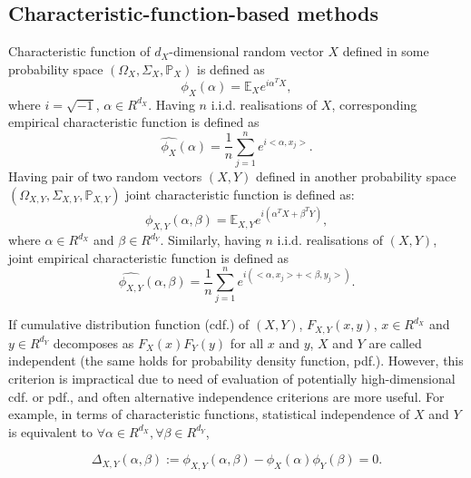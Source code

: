 \documentclass{article}
\begin{document}
\subsection{Characteristic-function-based methods}
\label{section:previous_work_cf}
Characteristic function of $d_{X}$-dimensional random vector $X$ defined in some probability space $(\Omega_{X}, \Sigma_{X}, \mathbb{P}_{X})$ is defined as 
\begin{equation}
    \label{eq:characteristic_function}
    \phi_{X}(\alpha) = \mathbb{E}_{X} e^{i\alpha^{T}X}, 
\end{equation}
where $i=\sqrt{-1}$, $\alpha \in R^{d_{X}}$. Having $n$ i.i.d. realisations of $X$, corresponding empirical characteristic function is defined as
\begin{equation}
    \label{eq:ecf}
  \widehat{\phi_{X}}(\alpha) = \frac{1}{n} \sum_{j=1}^{n} e^{i <\alpha, x_{j}>}.
\end{equation}
Having pair of two random vectors $(X,Y)$ defined in another probability space $(\Omega_{X,Y}, \Sigma_{X,Y}, \mathbb{P}_{X,Y})$  joint characteristic function is defined as:
\begin{equation}
    \label{eq:joint_characteristic_function}
    \phi_{X,Y}(\alpha,\beta) = \mathbb{E}_{X,Y} e^{i(\alpha^{T}X + \beta^{T}Y)},
\end{equation}
where $\alpha \in R^{d_{X}}$ and $\beta \in R^{d_{Y}}$. Similarly, having 
$n$ i.i.d. realisations of $(X,Y)$, joint empirical characteristic function is defined as
\begin{equation}
    \label{eq:joint_ecf}
\widehat{\phi_{X,Y}}(\alpha,\beta) = \frac{1}{n} \sum_{j=1}^{n} e^{i(<\alpha, x_{j}> + <\beta, y_{j}>) }.
\end{equation}

If cumulative distribution function (cdf.) of $(X,Y)$, $F_{X,Y}(x,y)$, $x \in R^{d_{X}}$ and $y \in R^{d_{Y}}$ decomposes as $F_{X}(x)F_{Y}(y)$ for all $x$ and $y$, $X$ and $Y$ are called independent (the same holds for probability density function, pdf.). However, this criterion is impractical due to need of evaluation of potentially high-dimensional cdf. or pdf., and often alternative independence criterions are more useful. For example, in terms of characteristic functions, statistical independence  of $X$ and $Y$ is equivalent to $\forall \alpha \in R^{d_X},\forall \beta \in R^{d_Y} $, 

\begin{equation}
\label{eq:kac_theorem}
\Delta_{X,Y}(\alpha, \beta) := \phi_{X,Y}(\alpha,\beta) - \phi_{X}(\alpha) \phi_{Y}(\beta) = 0.
\end{equation}
\end{document}

